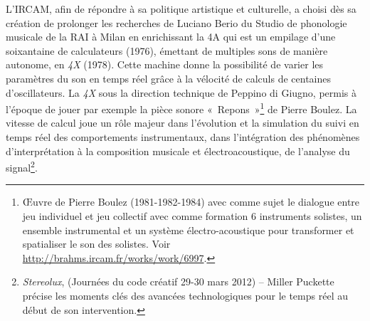 \documentclass{FramateX}
\begin{document}
\begin{refsection}
L'IRCAM, afin de répondre à sa politique artistique et
culturelle, a choisi dès sa création de prolonger les recherches de Luciano Berio du
Studio de phonologie musicale de la RAI à Milan en enrichissant la 4A
qui est un empilage d'une soixantaine de calculateurs (1976), émettant
de multiples sons de manière autonome, en \textit{4X} (1978). Cette machine
donne la possibilité de varier les paramètres du son en temps réel
grâce à la vélocité de calculs de centaines d'oscillateurs. La \textit{4X} sous
la direction technique de Peppino di Giugno, permis à l'époque de jouer
par exemple la pièce sonore «~Repons~»\footnote{Œuvre de Pierre Boulez
(1981-1982-1984) avec comme sujet le dialogue entre jeu individuel et
jeu collectif avec comme formation 6 instruments solistes, un ensemble
instrumental et un système électro-acoustique pour transformer et
spatialiser le son des solistes. Voir \url{http://brahms.ircam.fr/works/work/6997}.} de Pierre
Boulez. La vitesse de calcul joue un rôle majeur dans l'évolution et la
simulation du suivi en temps réel des comportements instrumentaux,
dans l'intégration des phénomènes d'interprétation à la composition musicale
 et électroacoustique, de l'analyse du signal\footnote{\textit{Stereolux},
(Journées du code créatif 29-30 mars 2012) -- Miller Puckette précise les
moments clés des avancées technologiques pour le temps réel au début de
son intervention.}.


\end{refsection}
\end{document}

